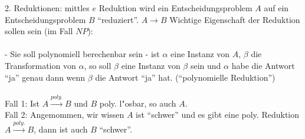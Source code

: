 2. Reduktionen: mittles $e$ Reduktion wird ein Entscheidungsproblem $A$ auf ein Entscheidungsproblem $B$ "`reduziert"'. $A\stackrel{}{\rightarrow} B$
Wichtige Eigenschaft der Reduktion sollen sein (im Fall $NP$):\\\\
- Sie soll polynomiell berechenbar sein
- ist $\alpha$ eine Instanz von $A$, $\beta$ die Transformation von $\alpha$, so soll $\beta$ eine Instanz von $\beta$ sein und $\alpha$ habe die Antwort "`ja"' genau dann wenn $\beta$ die Antwort "`ja"' hat. ("`polynomielle Reduktion"')\\\\
Fall 1: Ist $A\stackrel{poly.}{\rightarrow}B$ und $B$ poly. l"osbar, so auch $A$.\\
Fall 2: Angemommen, wir wissen $A$ ist "`schwer"' und es gibt eine poly. Reduktion $A\stackrel{poly.}{\rightarrow}B$, dann ist auch $B$ "`schwer"'.

